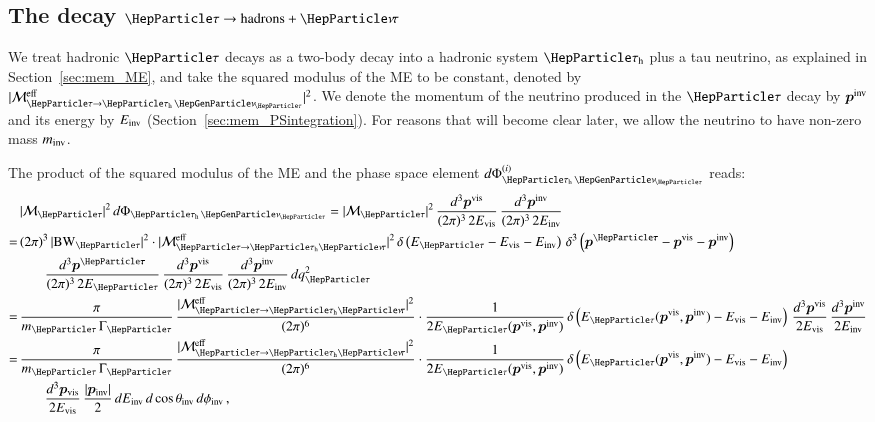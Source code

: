\subsection{The decay $\Pgt \to \textrm{hadrons} + \Pnut$}
\label{sec:appendix_tauToHadDecays}

We treat hadronic $\Pgt$ decays as a two-body decay into a hadronic
system $\tauh$ plus a tau neutrino,
as explained in Section~\ref{sec:mem_ME},
and take the squared modulus of the ME to be constant,
denoted by $\vert\mathcal{M}^{\eff}_{\Pgt \to \tauhnu}\vert^{2}$.
We denote the momentum of the neutrino produced in the $\Pgt$ decay by
$\bm{p^{\textrm{inv}}}$ and its energy by $E_{\textrm{inv}}$ (\cf Section~\ref{sec:mem_PSintegration}).
For reasons that will become clear later, we allow the neutrino to
have non-zero mass $m_{\textrm{inv}}$.

The product of the squared modulus of the ME and the phase space
element $d\Phi^{(i)}_{\tauhnu}$ reads:
\begin{align}
 & \, \vert\mathcal{M}_{\Pgt}\vert^{2} \,
 d\Phi_{\tauhnu} = \vert\mathcal{M}_{\Pgt}\vert^{2} \, \frac{d^{3}\bm{p^{\vis}}}{(2\pi)^{3} \, 2
   E_{\vis}} \, \frac{d^{3}\bm{p^{\inv}}}{(2\pi)^{3} \, 2 E_{\inv}} \nonumber \\
= & \, (2\pi)^{3} \, \vert \BW_{\Pgt} \vert^{2} \cdot \vert\mathcal{M}^{\eff}_{\Pgt \to
  \tauh\Pnut}\vert^{2} \, \delta \left( E_{\Pgt} - E_{\vis} -
  E_{\inv} \right) \, \delta^{3} \left( \bm{p^{\Pgt}} - \bm{p^{\vis}}
  - \bm{p^{\inv}} \right) \nonumber \\
& \qquad \frac{d^{3}\bm{p^{\Pgt}}}{(2\pi)^{3} \, 2 E_{\Pgt}} \, 
  \frac{d^{3}\bm{p^{\vis}}}{(2\pi)^{3} \, 2E_{\vis}} \, \frac{d^{3}\bm{p^{\inv}}}{(2\pi)^{3} \, 2 E_{\inv}} \, dq^{2}_{\Pgt} \nonumber \\
= & \, \frac{\pi}{m_{\Pgt} \, \Gamma_{\Pgt}} \, \frac{\vert\mathcal{M}^{\eff}_{\Pgt \to
  \tauh\Pnut}\vert^{2}}{(2\pi)^{6}} 
 \cdot \frac{1}{2 E_{\Pgt}(\bm{p^{\vis}}, \bm{p^{\inv}})} \, \delta \left( E_{\Pgt}(\bm{p^{\vis}}, \bm{p^{\inv}}) - E_{\vis} - E_{\inv} \right) \,
  \frac{d^{3}\bm{p^{\vis}}}{2 E_{\vis}} \, \frac{d^{3}\bm{p^{\inv}}}{2
    E_{\inv}} \nonumber \\
= & \, \frac{\pi}{m_{\Pgt} \, \Gamma_{\Pgt}} \, \frac{\vert\mathcal{M}^{\eff}_{\Pgt \to
  \tauh\Pnut}\vert^{2}}{(2\pi)^{6}} 
 \cdot \frac{1}{2 E_{\Pgt}(\bm{p^{\vis}}, \bm{p^{\inv}})} \, \delta
 \left( E_{\Pgt}(\bm{p^{\vis}}, \bm{p^{\inv}}) - E_{\vis} - E_{\inv}
 \right) \nonumber \\
& \qquad
  \frac{d^{3}\bm{p_{\vis}}}{2 E_{\vis}} \, \frac{\vert\bm{p_{\inv}}\vert}{2} \, dE_{\inv} \, d\cos\theta_{\inv} \, d\phi_{\inv} \, ,
\label{eq:hadTauDecaysPSint}
\end{align}

